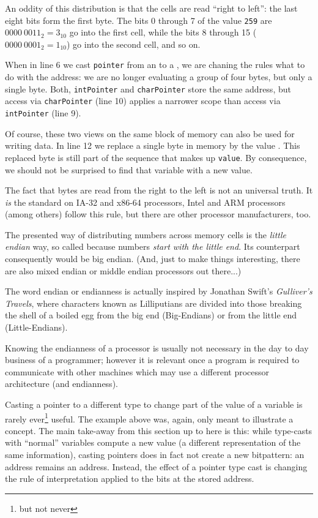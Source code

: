 {An oddity of this distribution is that the cells are read \enquote{right to left}: the last eight bits form the first byte. The bits 0 through 7 of the value \texttt{259} are $0000~0011_2 = 3_{10}$ go into the first cell, while the bits 8 through 15 ($0000~0001_2 = 1_{10}$) go into the second cell, and so on.

When in line 6 we cast \texttt{pointer} from an  to a , we are chaning the rules what to do with the address: we are no longer evaluating a group of four bytes, but only a single byte. Both, \texttt{intPointer} and \texttt{charPointer} store the same address, but access via \texttt{charPointer} (line 10) applies a narrower scope than access via \texttt{intPointer} (line 9).

Of course, these two views on the same block of memory can also be used for writing data. In line 12 we replace a single byte in memory by the value . This replaced byte is still part of the sequence that makes up \texttt{value}. By consequence, we should not be surprised to find that variable with a new value.

\begin{plusbox}[Endianness]
The fact that bytes are read from the right to the left is not an universal truth. It \emph{is} the standard on IA-32 and x86-64 processors, \ie Intel and ARM processors (among others) follow this rule, but there are other processor manufacturers, too.

The presented way of distributing numbers across memory cells is the \emph{little endian} way, so called because numbers \emph{start with the little end}. Its counterpart consequently would be big endian. (And, just to make things interesting, there are also mixed endian or middle endian processors out there...)

The word endian or endianness is actually inspired by Jonathan Swift's \emph{Gulliver's Travels}, where characters known as Lilliputians are divided into those breaking the shell of a boiled egg from the big end (Big-Endians) or from the little end (Little-Endians).

Knowing the endianness of a processor is usually not necessary in the day to day business of a programmer; however it is relevant once a program is required to communicate with other machines which may use a different processor architecture (and endianness).
\end{plusbox}

Casting a pointer to a different type to change part of the value of a variable is rarely ever\footnote{but not never} useful. The example above was, again, only meant to illustrate a concept. The main take-away from this section up to here is this: while type-casts with \enquote{normal} variables compute a new value (a different representation of the same information), casting pointers does in fact not create a new bitpattern: an address remains an address. Instead, the effect of a pointer type cast is changing the rule of interpretation applied to the bits at the stored address.

}
